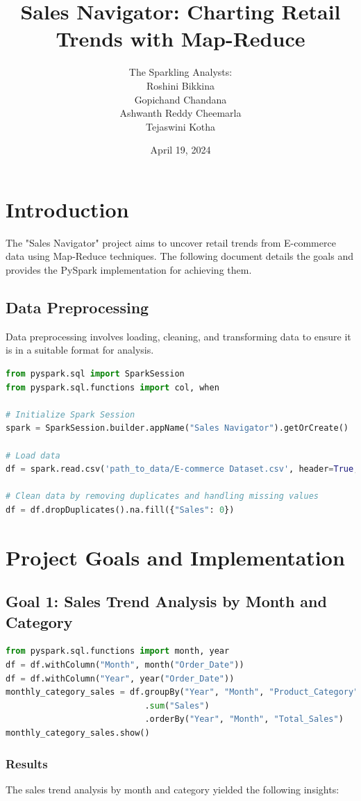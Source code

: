 \documentclass{article}
\title{Sales Navigator: Charting Retail Trends with Map-Reduce}
\author{
    The Sparkling Analysts: \\
    Roshini Bikkina \\
    Gopichand Chandana \\
    Ashwanth Reddy Cheemarla \\
    Tejaswini Kotha
}
\date{April 19, 2024}
\begin{document}
\maketitle

\section{Introduction}
The "Sales Navigator" project aims to uncover retail trends from E-commerce data using Map-Reduce techniques. The following document details the goals and provides the PySpark implementation for achieving them.

\subsection{Data Preprocessing}
Data preprocessing involves loading, cleaning, and transforming data to ensure it is in a suitable format for analysis.
\begin{lstlisting}[language=Python]
from pyspark.sql import SparkSession
from pyspark.sql.functions import col, when

# Initialize Spark Session
spark = SparkSession.builder.appName("Sales Navigator").getOrCreate()

# Load data
df = spark.read.csv('path_to_data/E-commerce Dataset.csv', header=True, inferSchema=True)

# Clean data by removing duplicates and handling missing values
df = df.dropDuplicates().na.fill({"Sales": 0})
\end{lstlisting}
\section{Project Goals and Implementation}
\subsection{Goal 1: Sales Trend Analysis by Month and Category}
\begin{lstlisting}[language=Python, caption={Sales trend analysis by month and category}]
from pyspark.sql.functions import month, year
df = df.withColumn("Month", month("Order_Date"))
df = df.withColumn("Year", year("Order_Date"))
monthly_category_sales = df.groupBy("Year", "Month", "Product_Category")
                            .sum("Sales")
                            .orderBy("Year", "Month", "Total_Sales")
monthly_category_sales.show()
\end{lstlisting}
\subsubsection{Results}
The sales trend analysis by month and category yielded the following insights:
\end{document}

